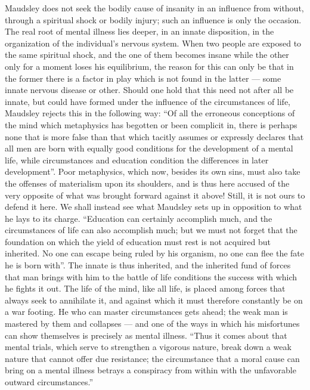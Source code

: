 \documentclass[12pt,a4paper,openany]{book}
\newcommand{\opage}[1]{\marginnote{\footnotesize\textit{[#1]}}}
\begin{document}
Maudsley does not seek the bodily cause of insanity in
an influence from without, through a spiritual shock or bodily
injury; such an influence is only the occasion.
The real root of mental illness lies deeper, in an innate
disposition, in the organization of the individual's nervous system. When
two people are exposed to the same spiritual shock, and the
one of them becomes insane while the other only for a
moment loses his equilibrium, the reason for this can only
be that in the former there is a factor in play which is not
found in the latter --- some innate nervous disease or other.
Should one hold that this need not after all be innate,
but could have formed under the influence of the circumstances of life,
Maudsley rejects this in the following way:
``Of all the erroneous conceptions of the mind which metaphysics
has begotten or been complicit in, there is perhaps none that
is more false than that which tacitly assumes or expressly
declares that all men are born with equally good conditions
for the development of a mental life, while circumstances
and education condition the differences in later
development''. Poor metaphysics, which now, besides its
own sins, must also take the offenses of materialism upon
its shoulders, and is thus here accused of the very opposite
of what was brought forward against it above! Still, it is not
ours to defend it here. We shall instead see what
Maudsley sets up in opposition to what he lays
to its charge. ``Education can certainly accomplish much, and
the circumstances of life can also accomplish much; but
we must not forget that the foundation on which the yield of
education must rest is not acquired but inherited. No one
can escape being ruled by his organism, no one can
flee the fate he is born with''. The innate is
thus inherited, and the inherited fund of forces that man
\opage{326}brings with him to the battle of life conditions the success with which
he fights it out. The life of the mind, like all life, is placed
among forces that always seek to annihilate it, and against
which it must therefore constantly be on a war footing. He who
can master circumstances gets ahead; the weak man
is mastered by them and collapses --- and one of the ways
in which his misfortunes can show themselves is precisely as mental illness.
``Thus it comes about that mental trials,
which serve to strengthen a vigorous nature, break down a weak nature
that cannot offer due resistance; the circumstance that
a moral cause can bring on a mental illness betrays a
conspiracy from within with the unfavorable outward circumstances.''
\end{document}
